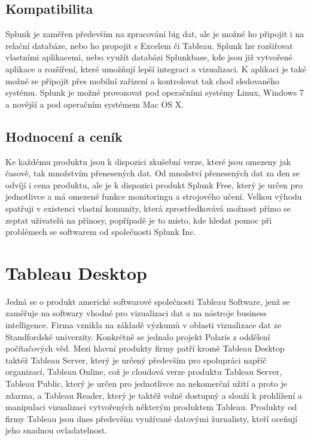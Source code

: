 \documentclass[czech,BP]{thesiskiv2}
\begin{document}
\subsection{Kompatibilita}
Splunk je zaměřen především na zpracování big dat, ale je možné ho připojit i na relační databáze, nebo ho propojit s Excelem či Tableau. Splunk lze rozšiřovat vlastními aplikacemi, nebo využít databázi Splunkbase, kde jsou již vytvořené aplikace a rozšíření, které umožňují lepší integraci a vizualizaci. K aplikaci je také možné se připojit přes mobilní zařízení a kontrolovat tak chod sledovaného systému. Splunk je možné provozovat pod operačními systémy Linux, Windows 7 a novější a pod operačním systémem Mac OS X. \cite{Splunk_a_kompatibilita}

\subsection{Hodnocení a ceník}
 Ke každému produktu jsou k dispozici zkušební verze, které jsou omezeny jak časově, tak množstvím přenesených dat. Od množství přenesených dat za den se odvíjí i cena produktu, ale je k dispozici produkt Splunk Free, který je určen pro jednotlivce a má omezené funkce monitoringu a strojového učení. Velkou výhodu spatřuji v existenci vlastní komunity, která zprostředkovává možnost přímo se zeptat uživatelů na přínosy, popřípadě je to místo, kde hledat pomoc při problémech se softwarem od společnosti Splunk Inc.
 
 
 \section{Tableau Desktop}
 Jedná se o produkt americké softwarové společnosti Tableau Software, jenž se zaměřuje na softwary vhodné pro vizualizaci dat a na nástroje business intelligence. Firma vznikla na základě výzkumů v oblasti vizualizace dat ze Standfordské univerzity. Konkrétně se jednalo projekt Polaris z oddělení počítačových věd.\cite{TableauHistory} Mezi hlavní produkty firmy patří kromě Tableau Desktop taktéž Tableau Server, který je určený především pro spolupráci napříč organizací, Tableau Online, což je cloudová verze produktu Tableau Server, Tableau Public, který je určen pro jednotlivce na nekomerční užití a proto je zdarma, a Tableau Reader, který je taktéž volně dostupný a slouží k prohlížení a manipulaci vizualizací vytvořených některým produktem Tableau. Produkty od firmy Tableau jsou dnes především využívané datovými žurnalisty, kteří oceňují jeho snadnou ovladatelnost.
 
\end{document}
